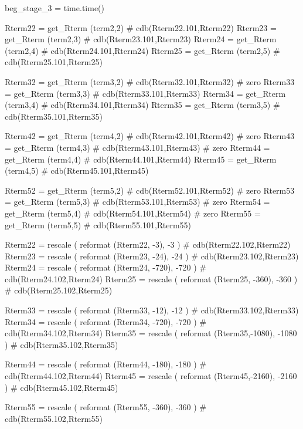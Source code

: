 \documentclass[12pt]{cdblatex}
\begin{document}
\begin{cadabra}
   beg_stage_3 = time.time()

   Rterm22 = get_Rterm (term2,2)                           # cdb(Rterm22.101,Rterm22)
   Rterm23 = get_Rterm (term2,3)                           # cdb(Rterm23.101,Rterm23)
   Rterm24 = get_Rterm (term2,4)                           # cdb(Rterm24.101,Rterm24)
   Rterm25 = get_Rterm (term2,5)                           # cdb(Rterm25.101,Rterm25)

   Rterm32 = get_Rterm (term3,2)                           # cdb(Rterm32.101,Rterm32)  # zero
   Rterm33 = get_Rterm (term3,3)                           # cdb(Rterm33.101,Rterm33)
   Rterm34 = get_Rterm (term3,4)                           # cdb(Rterm34.101,Rterm34)
   Rterm35 = get_Rterm (term3,5)                           # cdb(Rterm35.101,Rterm35)

   Rterm42 = get_Rterm (term4,2)                           # cdb(Rterm42.101,Rterm42)  # zero
   Rterm43 = get_Rterm (term4,3)                           # cdb(Rterm43.101,Rterm43)  # zero
   Rterm44 = get_Rterm (term4,4)                           # cdb(Rterm44.101,Rterm44)
   Rterm45 = get_Rterm (term4,5)                           # cdb(Rterm45.101,Rterm45)

   Rterm52 = get_Rterm (term5,2)                           # cdb(Rterm52.101,Rterm52)  # zero
   Rterm53 = get_Rterm (term5,3)                           # cdb(Rterm53.101,Rterm53)  # zero
   Rterm54 = get_Rterm (term5,4)                           # cdb(Rterm54.101,Rterm54)  # zero
   Rterm55 = get_Rterm (term5,5)                           # cdb(Rterm55.101,Rterm55)

   Rterm22 = rescale ( reformat (Rterm22,   -3),    -3 )   # cdb(Rterm22.102,Rterm22)
   Rterm23 = rescale ( reformat (Rterm23,  -24),   -24 )   # cdb(Rterm23.102,Rterm23)
   Rterm24 = rescale ( reformat (Rterm24, -720),  -720 )   # cdb(Rterm24.102,Rterm24)
   Rterm25 = rescale ( reformat (Rterm25, -360),  -360 )   # cdb(Rterm25.102,Rterm25)

   Rterm33 = rescale ( reformat (Rterm33,  -12),   -12 )   # cdb(Rterm33.102,Rterm33)
   Rterm34 = rescale ( reformat (Rterm34, -720),  -720 )   # cdb(Rterm34.102,Rterm34)
   Rterm35 = rescale ( reformat (Rterm35,-1080), -1080 )   # cdb(Rterm35.102,Rterm35)

   Rterm44 = rescale ( reformat (Rterm44, -180),  -180 )   # cdb(Rterm44.102,Rterm44)
   Rterm45 = rescale ( reformat (Rterm45,-2160), -2160 )   # cdb(Rterm45.102,Rterm45)

   Rterm55 = rescale ( reformat (Rterm55, -360),  -360 )   # cdb(Rterm55.102,Rterm55)
\end{cadabra}
\end{document}
